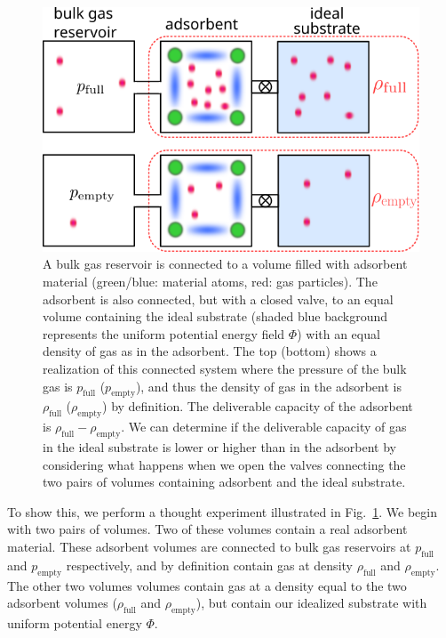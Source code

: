 \documentclass[twoside,twocolumn,9pt]{article}
\newcommand\V{\Phi}
\newcommand\pfull{\ensuremath{p_{\text{full}}}}
\newcommand\pempty{\ensuremath{p_{\text{empty}}}}
\newcommand\rhofull{\ensuremath{\rho_{\text{full}}}}
\newcommand\rhoempty{\ensuremath{\rho_{\text{empty}}}}
\begin{document}
\begin{figure}
    \centering
    \includegraphics[width=0.95\columnwidth]{four-cases-pro}
    \caption{A bulk gas reservoir is connected to a volume filled with adsorbent material (green/blue: material atoms, red: gas particles). The adsorbent is also connected, but with a closed valve, to an equal volume containing the ideal substrate (shaded blue background represents the uniform potential energy field $\V$) with an equal density of gas as in the adsorbent. The top (bottom) shows a realization of this connected system where the pressure of the bulk gas is $\pfull$ ($\pempty$), and thus the density of gas in the adsorbent is $\rhofull$ ($\rhoempty$) by definition. The deliverable capacity of the adsorbent is $\rhofull - \rhoempty$. We can determine if the deliverable capacity of gas in the ideal substrate is lower or higher than in the adsorbent by considering what happens when we open the valves connecting the two pairs of volumes containing adsorbent and the ideal substrate.}
    \label{fig:delta-gst-maximum}
\end{figure}
    
    
To show this, we perform a thought experiment illustrated in
Fig.~\ref{fig:delta-gst-maximum}. We begin with two pairs of volumes.  Two of
these volumes contain a real adsorbent material.  These adsorbent volumes are
connected to bulk gas reservoirs at $\pfull$ and $\pempty$ respectively, and
by definition contain gas at density $\rhofull$ and $\rhoempty$.  The other two volumes
volumes contain gas at a density equal to the two adsorbent volumes ($\rhofull$ and $\rhoempty$), but contain our
idealized substrate with uniform potential energy $\V$.
\end{document}

